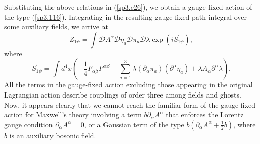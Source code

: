 \documentclass[a4paper,12pt]{article}
\begin{document}
Substituting the above relations in (\ref{sp3.e26}), we obtain a gauge-fixed
action of the type (\ref{sp3.116}). Integrating in the resulting gauge-fixed
path integral over some auxiliary fields, we arrive at 
\begin{equation}
Z_{1\psi }=\int \mathcal{D}A^{\alpha }\mathcal{D}\eta _{a}\mathcal{D}\pi _{a}%
\mathcal{D}\lambda \exp \left( iS_{1\psi }^{\prime }\right) ,
\label{sp3.e36}
\end{equation}
where 
\begin{equation}
S_{1\psi }^{\prime }=\int d^{4}x\left( -\frac{1}{4}F_{\alpha \beta
}F^{\alpha \beta }-\sum\limits_{a=1}^{3}\lambda \left( \partial _{\alpha
}\pi _{a}\right) \left( \partial ^{\alpha }\eta _{a}\right) +\lambda
A_{\alpha }\partial ^{\alpha }\lambda \right) .  \label{sp3.e37}
\end{equation}
All the terms in the gauge-fixed action excluding those appearing in the
original Lagrangian action describe couplings of order three among fields
and ghosts. Now, it appears clearly that we cannot reach the familiar form
of the gauge-fixed action for Maxwell's theory involving a term $b\partial
_{\alpha }A^{\alpha }$ that enforces the Lorentz gauge condition $\partial
_{\alpha }A^{\alpha }=0$, or a Gaussian term of the type $b\left( \partial
_{\alpha }A^{\alpha }+\frac{1}{2}b\right) $, where $b$ is an auxiliary
bosonic field.
\end{document}
